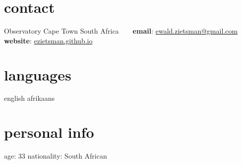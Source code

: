 \documentclass[]{friggeri-cv} %
\begin{document}


\begin{aside} %
\section{contact}
Observatory
Cape Town
South Africa
~
~
\textbf{email}:
\href{mailto:ewald.zietsman@gmail.com}{ewald.zietsman@gmail.com}
~
\textbf{website}:
\href{http://ezietsman.github.io/}{ezietsman.github.io}
\section{languages}
english 
afrikaans
\section{personal info}
age: 33
nationality: South African
\end{aside}
\end{document}
